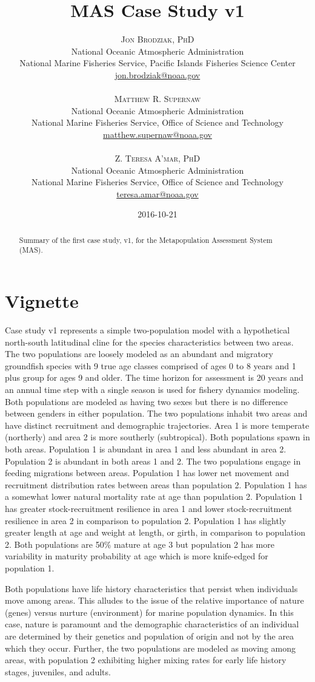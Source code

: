 \documentclass[12pt]{article}
\title{\vspace{-15mm}\fontsize{24pt}{24pt}\selectfont\textbf{MAS Case Study v1}} %
\author{
	\large
	\textsc{Jon Brodziak, PhD}\\[2mm] %
	\normalsize National Oceanic Atmospheric Administration \\ %
	\normalsize National Marine Fisheries Service, Pacific Islands Fisheries Science Center\\ %
	\normalsize \href{mailto:jon.brodziak@noaa.gov}{jon.brodziak@noaa.gov} \\ %
	\\
	\textsc{Matthew R. Supernaw}\\[2mm] %
	\normalsize National Oceanic Atmospheric Administration \\ %
	\normalsize National Marine Fisheries Service, Office of Science and Technology\\ %
	\normalsize \href{mailto:matthew.supernaw@noaa.gov}{matthew.supernaw@noaa.gov} \\ %
	\\
	\textsc{Z. Teresa A'mar, PhD}\\[2mm] %
	\normalsize National Oceanic Atmospheric Administration \\ %
	\normalsize National Marine Fisheries Service, Office of Science and Technology\\ %
	\normalsize \href{mailto:teresa.amar@noaa.gov}{teresa.amar@noaa.gov} \\%
	\vspace{-5mm}
}
\date{2016-10-21}
\begin{document}
\maketitle
\thispagestyle{fancy} %


\newpage
\tableofcontents
\newpage


\begin{abstract}
Summary of the first case study, v1, for the Metapopulation Assessment System (MAS).
\end{abstract}


\section{Vignette}

Case study v1 represents a simple two-population model with a hypothetical north-south latitudinal cline for the species characteristics between two areas. The two populations are loosely modeled as an abundant and migratory groundfish species with 9 true age classes comprised of ages 0 to 8 years and 1 plus group for ages 9 and older. The time horizon for assessment is 20 years and an annual time step with a single season is used for fishery dynamics modeling. Both populations are modeled as having two sexes but there is no difference between genders in either population. The two populations inhabit two areas and have distinct recruitment and demographic trajectories. Area 1 is more temperate (northerly) and area 2 is more southerly (subtropical). Both populations spawn in both areas. Population 1 is abundant in area 1 and less abundant in area 2. Population 2 is abundant in both areas 1 and 2. The two populations engage in feeding migrations between areas. Population 1 has lower net movement and recruitment distribution rates between areas than population 2. Population 1 has a somewhat lower natural mortality rate at age than population 2. Population 1 has greater stock-recruitment resilience in area 1 and lower stock-recruitment resilience in area 2 in comparison to population 2. Population 1 has slightly greater length at age and weight at length, or girth, in comparison to population 2. Both populations are 50\% mature at age 3 but population 2 has more variability in maturity probability at age which is more knife-edged for population 1.

Both populations have life history characteristics that persist when individuals move among areas. This alludes to the issue of the relative importance of nature (genes) versus nurture (environment) for marine population dynamics. In this case, nature is paramount and the demographic characteristics of an individual are determined by their genetics and population of origin and not by the area which they occur. Further, the two populations are modeled as moving among areas, with population 2 exhibiting higher mixing rates for early life history stages, juveniles, and adults.
\end{document}
